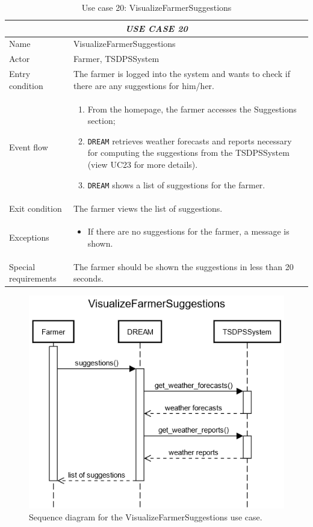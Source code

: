 \documentclass{article}
\begin{document}
\centering
\begin{longtable}{|p{3.5cm}|m{8cm}|}
\caption{Use case 20: VisualizeFarmerSuggestions}
 \label{uc20}
 \hline
 \multicolumn{2}{|c|}{\cellcolor{white}\emph{USE CASE 20}} \\
 \endfirsthead
 \endhead
 \endfoot
 \endlastfoot
 \hline
 Name & VisualizeFarmerSuggestions\\
 \hline
 Actor & Farmer, TSDPSSystem\\
 \hline
 Entry condition & The farmer is logged into the system and wants to check if there are any suggestions for him/her.\\
 \hline
 Event flow & \begin{enumerate}
    \item From the homepage, the farmer accesses the Suggestions section;
    \item \verb|DREAM| retrieves weather forecasts and reports necessary for computing the suggestions from the TSDPSSystem (view UC23 for more details).
    \item \verb|DREAM| shows a list of suggestions for the farmer.
 \end{enumerate}\\
 \hline
 Exit condition & The farmer views the list of suggestions.\\
 \hline
 Exceptions & \begin{itemize}
     \item If there are no suggestions for the farmer, a message is shown.
 \end{itemize}\\
 \hline
 Special requirements & The farmer should be shown the suggestions in less than 20 seconds.\\
 \hline
\end{longtable}
\begin{figure}[H]
    \centering
	\includegraphics[scale=0.5]{sequence_diagrams/VisualizeFarmerSuggestions.png}
    \caption{Sequence diagram for the VisualizeFarmerSuggestions use case.}
\end{figure}
\newpage
\end{document}

